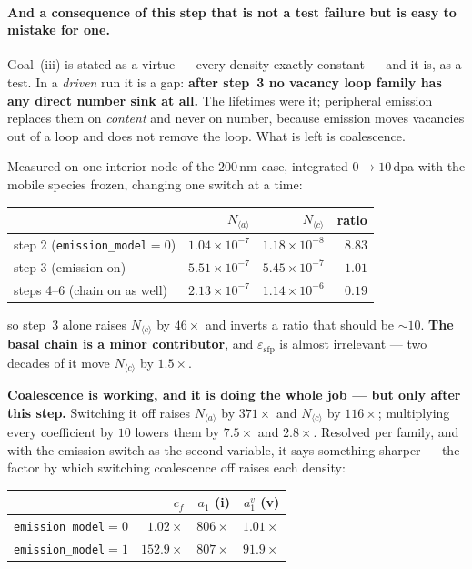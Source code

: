 \documentclass{article}
\newcommand{\code}[1]{\texttt{#1}}
\begin{document}
\paragraph{And a consequence of this step that is not a test failure but is
easy to mistake for one.} Goal~(iii) is stated as a virtue --- every density
exactly constant --- and it is, as a test. In a \emph{driven} run it is a gap:
\textbf{after step~3 no vacancy loop family has any direct number sink at all.}
The lifetimes were it; peripheral emission replaces them on \emph{content} and
never on number, because emission moves vacancies out of a loop and does not
remove the loop. What is left is coalescence.

Measured on one interior node of the $200$\,nm case, integrated $0\to10\,$dpa
with the mobile species frozen, changing one switch at a time:

\begin{center}\small
\begin{tabular}{@{}lrrr@{}}
\toprule
 & $N_{\langle a\rangle}$ & $N_{\langle c\rangle}$ & ratio\\
\midrule
step 2 (\code{emission\_model}$=0$) & $1.04\times10^{-7}$ & $1.18\times10^{-8}$ & $8.83$\\
step 3 (emission on)                & $5.51\times10^{-7}$ & $5.45\times10^{-7}$ & $1.01$\\
steps 4--6 (chain on as well)       & $2.13\times10^{-7}$ & $1.14\times10^{-6}$ & $0.19$\\
\bottomrule
\end{tabular}
\end{center}

so step~3 alone raises $N_{\langle c\rangle}$ by $46\times$ and inverts a ratio
that should be $\sim10$. \textbf{The basal chain is a minor contributor}, and
$\varepsilon_{\mathrm{sfp}}$ is almost irrelevant --- two decades of it move
$N_{\langle c\rangle}$ by $1.5\times$.

\textbf{Coalescence is working, and it is doing the whole job --- but only after
this step.} Switching it off raises $N_{\langle a\rangle}$ by $371\times$ and
$N_{\langle c\rangle}$ by $116\times$; multiplying every coefficient by $10$
lowers them by $7.5\times$ and $2.8\times$. Resolved per family, and with the
emission switch as the second variable, it says something sharper --- the factor
by which switching coalescence off raises each density:

\begin{center}\small
\begin{tabular}{@{}lrrr@{}}
\toprule
 & $c_f$ & $a_1$ (i) & $a^v_1$ (v)\\
\midrule
\code{emission\_model}$=0$ & $1.02\times$ & $806\times$ & $1.01\times$\\
\code{emission\_model}$=1$ & $152.9\times$ & $807\times$ & $91.9\times$\\
\bottomrule
\end{tabular}
\end{center}
\end{document}

